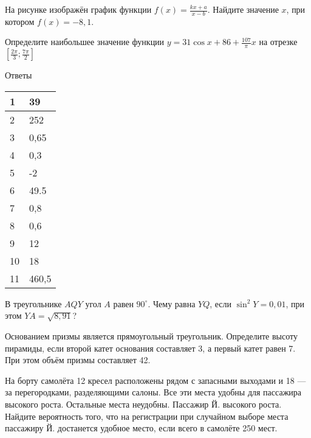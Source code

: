 \documentclass[twocolumn]{article}
\begin{document}
\begin{taskBN}{10}
На рисунке изображён график функции $f(x)=\frac{kx+a}{x-b}$. Найдите значение $x$, при котором $f(x)= -8{,}1 $.\vspace{2.5cm}
\end{taskBN}

\begin{taskBN}{11}
Определите наибольшее значение функции $y = 31\cos x+86+\frac{107}{\pi}x$ на отрезке $\left[\frac{2\pi}{3};\frac{7\pi}{2} \right]$
\end{taskBN}

\newpage
 Ответы

\begin{table}[h]\begin{tabular}{|l|l|}
\hline
1 & 39 
\\
\hline
2 & 252
\\
\hline
3 & 0,65
\\
\hline
4 & 0,3
\\
\hline
5 & -2
\\
\hline
6 & 49.5
\\
\hline
7 & 0,8
\\
\hline
8 & 0,6
\\
\hline
9 & 12
\\
\hline
10 & 18
\\
\hline
11 & 460,5
\\
\hline
\end{tabular}\end{table}



\newpage




\cleardoublepage
\def\examvart{Вариант 19.3}
\normalsize

\startpartone
\large




\begin{taskBN}{1}
В треугольнике $AQY$ угол $A$ равен $90^\circ$. Чему равна  $YQ$, если $\sin^2{Y}=0,01$, при этом  $YA=\sqrt{8,91}$? 
\end{taskBN}

\begin{taskBN}{2}
Основанием призмы является  прямоугольный треугольник. Определите высоту пирамиды, если второй катет основания составляет 3, а первый катет равен 7. При этом объём призмы составляет 42. 
\end{taskBN}

\begin{taskBN}{3}
На борту самолёта 12 кресел расположены рядом с запасными выходами и 18 — за перегородками, разделяющими салоны. Все эти места удобны для пассажира высокого роста. Остальные места неудобны. Пассажир Й. высокого роста. Найдите вероятность того, что на регистрации при случайном выборе места пассажиру Й. достанется удобное место, если всего в самолёте 250 мест.
\end{taskBN}
\end{document}
